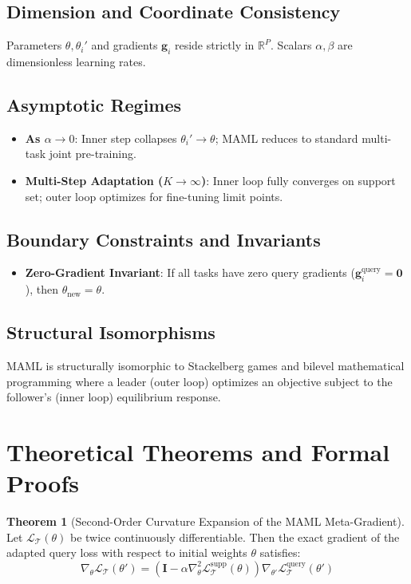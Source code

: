 \documentclass[11pt,a4paper]{article}
\theoremstyle{definition}
\newtheorem{theorem}{\textbf{Theorem}}[section]
\begin{document}
\subsection{Dimension and Coordinate Consistency}
Parameters $\theta, \theta_i'$ and gradients $\mathbf{g}_i$ reside strictly in $\mathbb{R}^P$. Scalars $\alpha, \beta$ are dimensionless learning rates.

\subsection{Asymptotic Regimes}
\begin{itemize}
    \item \textbf{As $\alpha \to 0$}: Inner step collapses $\theta_i' \to \theta$; MAML reduces to standard multi-task joint pre-training.
    \item \textbf{Multi-Step Adaptation ($K \to \infty$)}: Inner loop fully converges on support set; outer loop optimizes for fine-tuning limit points.
\end{itemize}

\subsection{Boundary Constraints and Invariants}
\begin{itemize}
    \item \textbf{Zero-Gradient Invariant}: If all tasks have zero query gradients ($\mathbf{g}_i^{\text{query}} = \mathbf{0}$), then $\theta_{\text{new}} = \theta$.
\end{itemize}

\subsection{Structural Isomorphisms}
MAML is structurally isomorphic to Stackelberg games and bilevel mathematical programming where a leader (outer loop) optimizes an objective subject to the follower's (inner loop) equilibrium response.

\section{Theoretical Theorems and Formal Proofs}

\begin{theorem}[Second-Order Curvature Expansion of the MAML Meta-Gradient]
Let $\mathcal{L}_{\mathcal{T}}(\theta)$ be twice continuously differentiable. Then the exact gradient of the adapted query loss with respect to initial weights $\theta$ satisfies:
{\boldmath
\begin{equation}
\nabla_\theta \mathcal{L}_{\mathcal{T}}(\theta') = \left( \mathbf{I} - \alpha \nabla_\theta^2 \mathcal{L}_{\mathcal{T}}^{\text{supp}}(\theta) \right) \nabla_{\theta'} \mathcal{L}_{\mathcal{T}}^{\text{query}}(\theta')
\end{equation}
}
\end{theorem}
\end{document}

